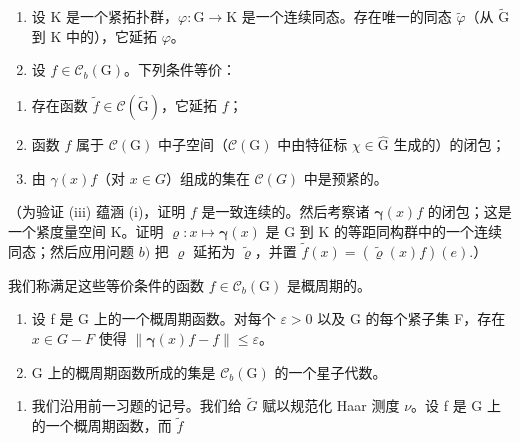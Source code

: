 \begin{enumerate}
\def\labelenumi{\alph{enumi})}
\setcounter{enumi}{1}
\item
  设 K 是一个紧拓扑群，\(\varphi\colon\mathrm{G}\to\mathrm{K}\) 是一个连续同态。存在唯一的同态 \(\widetilde{\varphi}\)（从 \(\widetilde{\mathrm{G}}\) 到 K 中的），它延拓 \(\varphi\)。
\item
  设 \(f \in \mathcal{C}_b(\mathrm{G})\)。下列条件等价：
\end{enumerate}

\begin{enumerate}
\def\labelenumi{(\roman{enumi})}
\item
  存在函数 \(\widetilde{f} \in \mathcal{C}(\widetilde{\mathrm{G}})\)，它延拓 \(f\)；
\item
  函数 \(f\) 属于 \(\mathcal{C}(\mathrm{G})\) 中子空间（\(\mathcal{C}(\mathrm{G})\) 中由特征标 \(\chi\in\widehat{\mathrm{G}}\) 生成的）的闭包；
\item
  由 \(\gamma(x)f\)（对 \(x\in G\)）组成的集在 \(\mathcal{C}(G)\) 中是预紧的。
\end{enumerate}

（为验证 (iii) 蕴涵 (i)，证明 \(f\) 是一致连续的。然后考察诸 \(\pmb{\gamma}(x)f\) 的闭包；这是一个紧度量空间 K。证明 \(\varrho \colon x \mapsto \pmb{\gamma}(x)\) 是 G 到 K 的等距同构群中的一个连续同态；然后应用问题 \(b)\) 把 \(\varrho\) 延拓为 \(\widetilde{\varrho}\)，并置 \(\widetilde{f}(x) = (\widetilde{\varrho}(x)f)(e).\)）

我们称满足这些等价条件的函数 \(f \in \mathcal{C}_b(\mathrm{G})\) 是概周期的。

\begin{enumerate}
\def\labelenumi{\alph{enumi})}
\setcounter{enumi}{3}
\item
  设 f 是 G 上的一个概周期函数。对每个 \(\varepsilon > 0\) 以及 G 的每个紧子集 F，存在 \(x \in G - F\) 使得 \(\|\boldsymbol{\gamma}(x)f - f\| \leqslant \varepsilon\)。
\item
  G 上的概周期函数所成的集是 \(\mathcal{C}_{b}(\mathrm{G})\) 的一个星子代数。
\end{enumerate}

\begin{enumerate}
\def\labelenumi{\arabic{enumi})}
\setcounter{enumi}{54}
\tightlist
\item
  我们沿用前一习题的记号。我们给 \(\widetilde{G}\) 赋以规范化 Haar 测度 \(\nu\)。设 f 是 G 上的一个概周期函数，而 \(\widetilde{f}\)
\end{enumerate}

